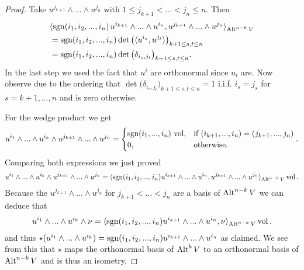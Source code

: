\documentclass[../main.tex]{subfiles}
\begin{document}
\begin{proof}
    Take $u^{j_{k+1}} \wedge ... \wedge u^{j_n}$ with 
    $1 \leq j_{k+1} < ... < j_n \leq n$. Then 
    \begin{align*}
        &\langle \operatorname{sgn}(i_1,i_2,...,i_n) \, u^{i_{k+1}} \wedge ... \wedge u^{i_{n}},
            u^{j_{k+1}} \wedge ... \wedge u^{j_{n}} \rangle_{{\text{Alt}^{n-k}\,V}}
        \\ &= \operatorname{sgn}(i_1,i_2,...,i_n) \det \big( \langle u^{i_s}, u^{j_t} \rangle \big)_{k+1 \leq s,t \leq n}
        \\ &= \operatorname{sgn}(i_1,i_2,...,i_n) \det \big( \delta_{i_s,j_t} \big)_{k+1 \leq s,t \leq n}.
    \end{align*}
    In the last step we used the fact that $u^i$ are orthonormal since $u_i$ 
    are. Now observe due to the ordering that 
    $\det \big( \delta_{i_s,j_t} \big)_{k+1 \leq s,t \leq n} = 1$ i.i.f.
    $i_s = j_s$ for $s = k+1,...,n$ and is zero otherwise.

    For the wedge product we get
    \begin{align*}
        u^{i_1} \wedge ... \wedge u^{i_{k}} \wedge u^{j_{k+1}} \wedge ... 
            \wedge u^{j_n}
        =   \begin{cases}
                \operatorname{sgn}(i_1, ..., i_n)\, \operatorname{vol}, & \text{if $(i_{k+1},...,i_n) = (j_{k+1},...,j_n)$} \\
                0,  & \text{otherwise.}
            \end{cases}.
    \end{align*}
    Comparing both expressions we just proved
    \begin{align*}
        u^{i_1} \wedge ... \wedge u^{i_{k}} \wedge u^{j_{k+1}} \wedge ... \wedge u^{j_n}
        = \langle \operatorname{sgn}(i_1,i_2,...,i_n) u^{i_{k+1}} \wedge ... \wedge u^{i_{n}},
            u^{j_{k+1}} \wedge ... \wedge u^{j_{n}} \rangle_{{\text{Alt}^{n-k}\,V}} \operatorname{vol}.
    \end{align*}
    Because the $u^{j_{k+1}} \wedge ... \wedge u^{j_n}$ for $j_{k+1} < ... < j_n$ are a 
    basis of ${\text{Alt}^{n-k}\,V}$ we can deduce that 
    \begin{align*}
        u^{i_1} \wedge ... \wedge u^{i_{k}} \wedge \nu = \langle \operatorname{sgn}(i_1,i_2,...,i_n) u^{i_{k+1}} \wedge 
        ... \wedge u^{i_{n}}, \nu \rangle_{{\text{Alt}^{n-k}\,V}} \operatorname{vol}.
    \end{align*}
    and thus  
    $\star (u^{i_1} \wedge ... \wedge u^{i_{k}}) = 
    \operatorname{sgn}(i_1,i_2,...,i_n) u^{i_{k+1}} \wedge ... \wedge u^{i_{n}}$ as claimed.
    We see from this that $\star$ maps the orthonormal basis of ${\text{Alt}^{k}\,V}$ 
    to an orthonormal
    basis of ${\text{Alt}^{n-k}\,V}$ and is thus an isometry.


\end{proof}
\end{document}
